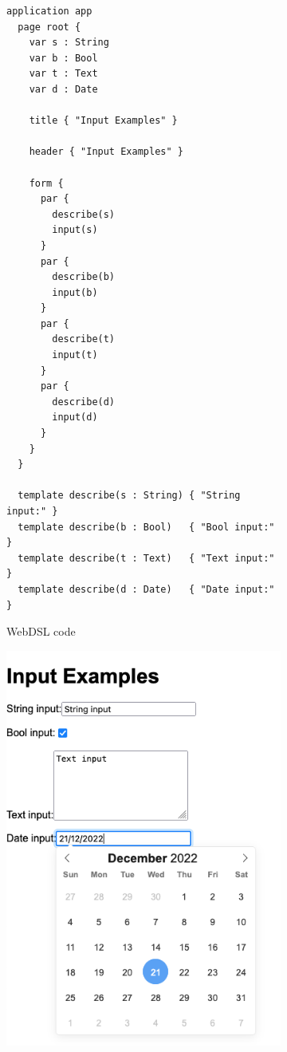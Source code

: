       \begin{figure}
        \begin{subfigure}[t]{0.45\textwidth}
          \begin{verbatim}
application app
  page root {
    var s : String
    var b : Bool
    var t : Text
    var d : Date

    title { "Input Examples" }

    header { "Input Examples" }

    form {
      par {
        describe(s)
        input(s)
      }
      par {
        describe(b)
        input(b)
      }
      par {
        describe(t)
        input(t)
      }
      par {
        describe(d)
        input(d)
      }
    }
  }

  template describe(s : String) { "String input:" }
  template describe(b : Bool)   { "Bool input:"   }
  template describe(t : Text)   { "Text input:"   }
  template describe(d : Date)   { "Date input:"   }
          \end{verbatim}
          \caption{\label{fig:webdsl-template-overloading-webdsl}WebDSL code}
        \end{subfigure}
        \begin{subfigure}[t]{0.55\textwidth}
          \capstart
          \includegraphics[width=\textwidth]{../img/webdsl-template-overloading}

\end{subfigure}
\end{figure}
